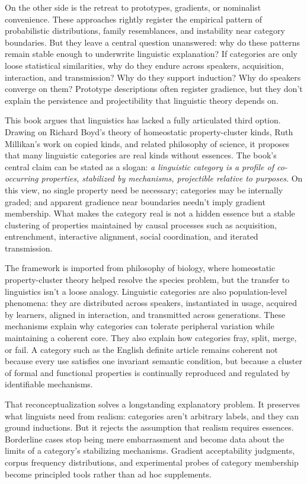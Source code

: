 \documentclass[11pt]{book}
\begin{document}
On the other side is the retreat to prototypes, gradients, or nominalist convenience. These approaches rightly register the empirical pattern of probabilistic distributions, family resemblances, and instability near category boundaries. But they leave a central question unanswered: why do these patterns remain stable enough to underwrite linguistic explanation? If categories are only loose statistical similarities, why do they endure across speakers, acquisition, interaction, and transmission? Why do they support induction? Why do speakers converge on them? Prototype descriptions often register gradience, but they don't explain the persistence and projectibility that linguistic theory depends on.

This book argues that linguistics has lacked a fully articulated third option. Drawing on Richard Boyd's theory of homeostatic property-cluster kinds, Ruth Millikan's work on copied kinds, and related philosophy of science, it proposes that many linguistic categories are real kinds without essences. The book's central claim can be stated as a slogan: \emph{a linguistic category is a profile of co-occurring properties, stabilized by mechanisms, projectible relative to purposes}. On this view, no single property need be necessary; categories may be internally graded; and apparent gradience near boundaries needn't imply gradient membership. What makes the category real is not a hidden essence but a stable clustering of properties maintained by causal processes such as acquisition, entrenchment, interactive alignment, social coordination, and iterated transmission.

The framework is imported from philosophy of biology, where homeostatic property-cluster theory helped resolve the species problem, but the transfer to linguistics isn't a loose analogy. Linguistic categories are also population-level phenomena: they are distributed across speakers, instantiated in usage, acquired by learners, aligned in interaction, and transmitted across generations. These mechanisms explain why categories can tolerate peripheral variation while maintaining a coherent core. They also explain how categories fray, split, merge, or fail. A category such as the English definite article remains coherent not because every use satisfies one invariant semantic condition, but because a cluster of formal and functional properties is continually reproduced and regulated by identifiable mechanisms.

That reconceptualization solves a longstanding explanatory problem. It preserves what linguists need from realism: categories aren't arbitrary labels, and they can ground inductions. But it rejects the assumption that realism requires essences. Borderline cases stop being mere embarrassment and become data about the limits of a category's stabilizing mechanisms. Gradient acceptability judgments, corpus frequency distributions, and experimental probes of category membership become principled tools rather than ad hoc supplements.
\end{document}
